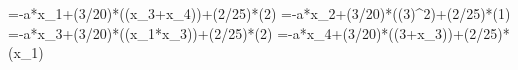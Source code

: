 =-a*x_1+(3/20)*\sin((x_3+x_4))+(2/25)*\cos(2)
=-a*x_2+(3/20)*\sin((3)^2)+(2/25)*\cos(1)
=-a*x_3+(3/20)*\sin((x_1*x_3))+(2/25)*\cos(2)
=-a*x_4+(3/20)*\sin((3+x_3))+(2/25)*\cos(x_1)

